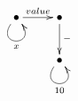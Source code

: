 $\xymatrix{
   \bullet \ar@(dl,dr)[]_{x} \ar[r]^{value} & \bullet \ar[d]^{-} \\
   & \bullet \ar@(dl,dr)[]_{10}
}$
